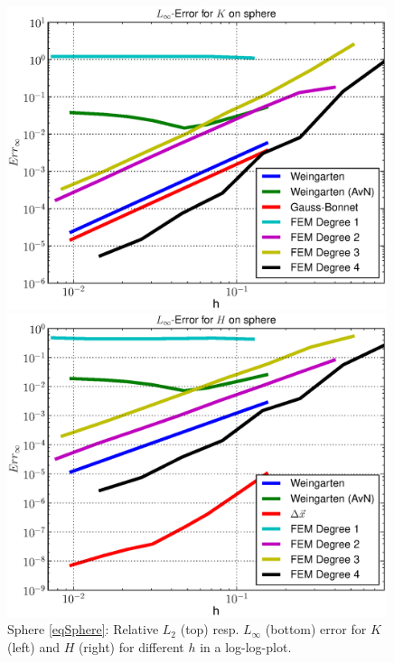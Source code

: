 \begin{figure}
\begin{minipage}[htp]{.23\textwidth}
    \end{minipage}\\
    \begin{minipage}[htp]{.23\textwidth}
      \centering
      \includegraphics[width=0.99\textwidth]{bilder/sphere/LMaxK.eps}
    \end{minipage}\hfill
    \begin{minipage}[htp]{.23\textwidth}
      \centering
      \includegraphics[width=0.99\textwidth]{bilder/sphere/LMaxH.eps}
    \end{minipage}
    \caption{Sphere \eqref{eqSphere}: Relative \( L_{2} \) (top) resp. \( L_{\infty} \) (bottom) error for \( K \) (left) and
                                                     \( H \) (right) for different \( h \) in a log-log-plot.}
    \label{figSphere}
  \end{figure}

